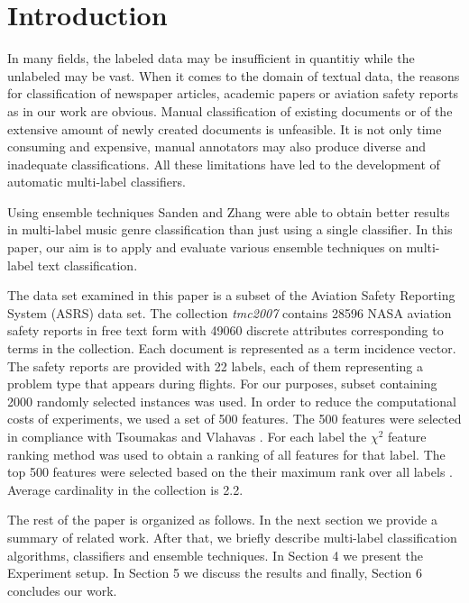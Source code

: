 \section{Introduction}
In many fields, the labeled data may be insufficient in quantitiy while the unlabeled may be vast. When it comes to the domain of textual data, the reasons for classification of newspaper articles, academic papers or aviation safety reports as in our work are obvious. Manual classification of existing documents or of the extensive amount of newly created documents is unfeasible. It is not only time consuming and expensive, manual annotators may also produce diverse and inadequate classifications. All these limitations have led to the development of automatic multi-label classifiers.

Using ensemble techniques Sanden and Zhang \cite{sanden2011enhancing} were able to obtain better results in multi-label music genre classification than just using a single classifier. In this paper, our aim is to apply and evaluate various ensemble techniques on multi-label text classification.

The data set examined in this paper is a subset of the Aviation Safety Reporting System (ASRS) data set. The collection \emph{tmc2007} contains 28596 NASA aviation safety reports in free text form with 49060 discrete attributes corresponding to terms in the collection. Each document is represented as a term incidence vector. The safety reports are provided with 22 labels, each of them representing a problem type that appears during flights. For our purposes, subset containing 2000 randomly selected instances was used. In order to reduce the computational costs of experiments, we used a set of 500 features. The 500 features were selected in compliance with Tsoumakas and Vlahavas \cite{TsoumakasVlahavas2007kLablesets}. For each label the $\chi^{2}$ feature ranking method was used to obtain a ranking of all features for that label. The top 500 features were selected based on the their maximum rank over all labels \cite{TsoumakasVlahavas2007kLablesets}. Average cardinality in the collection is 2.2.

The rest of the paper is organized as follows. In the next section we provide a summary of related work. After that, we briefly describe multi-label classification algorithms, classifiers and ensemble techniques. In Section 4 we present the Experiment setup. In Section 5 we discuss the results and finally, Section 6 concludes our work.